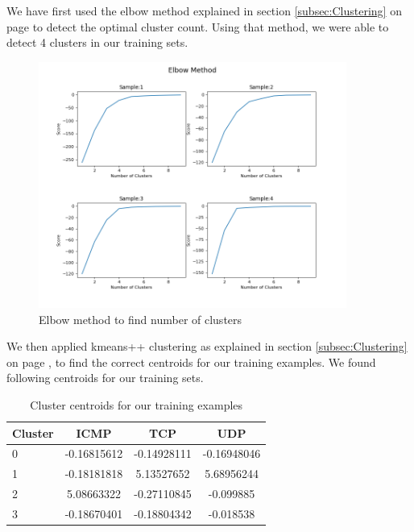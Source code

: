 \documentclass[12pt,oneside,a4paper]{article}
\begin{document}
We have first used the elbow method explained in section \ref{subsec:Clustering} on page \pageref{subsec:Clustering} to detect the optimal cluster count. Using that method, we were able to detect 4 clusters in our training sets.

\begin{figure}[H]
\centering
\includegraphics[width=0.90\textwidth]{elbow-method-applied.png}
\caption{Elbow method to find number of clusters}
\label{fig:elbow-method-applied}
\end{figure}

We then applied kmeans++ clustering as explained in section \ref{subsec:Clustering} on page \pageref{subsec:Clustering}, to find the correct centroids for our training examples. We found following centroids for our training sets.

\begin{table}[H]
\centering
  \begin{tabular}{ l | c  c  c }
    Cluster      & ICMP  & TCP  & UDP \\
    \hline
    0         &{-0.16815612}       &{-0.14928111}    &{-0.16948046} \\
    1         &{-0.18181818}       &{5.13527652}     &{5.68956244} \\
    2         &{5.08663322}        &{-0.27110845}    &{-0.099885} \\
    3         &{-0.18670401}       &{-0.18804342}    &{-0.018538} \\
  \end{tabular}
\caption{Cluster centroids for our training examples} \label{table:centroids}
\end{table}
\end{document}
